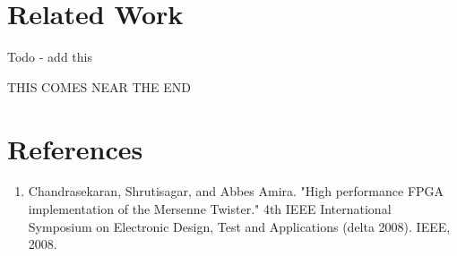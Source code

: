 \documentclass{article}
\begin{document}
    \section{Related Work}

    Todo - add this

    THIS COMES NEAR THE END

    \break
    \section*{References}

    \begin{enumerate}

    \item Chandrasekaran, Shrutisagar, and Abbes Amira. "High performance FPGA implementation of the Mersenne Twister." 4th IEEE International Symposium on Electronic Design, Test and Applications (delta 2008). IEEE, 2008.

    \end{enumerate}
    
\end{document}
